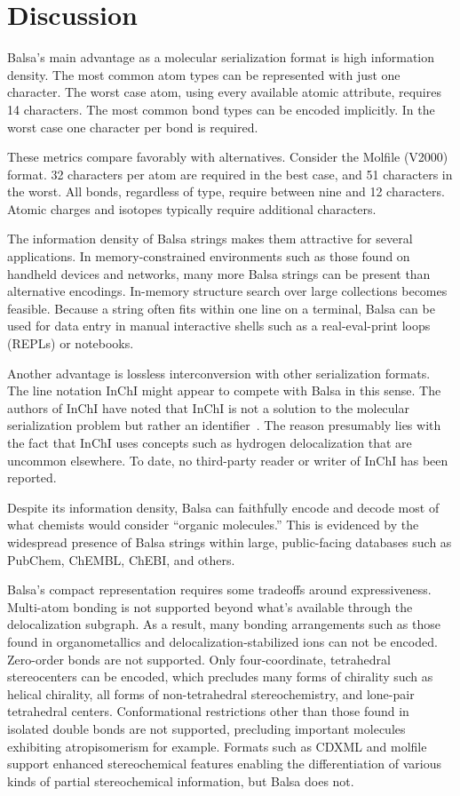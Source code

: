 \documentclass{article}
\begin{document}
\section*{Discussion}

Balsa's main advantage as a molecular serialization format is high information density. The most common atom types can be represented with just one character. The worst case atom, using every available atomic attribute, requires 14 characters. The most common bond types can be encoded implicitly. In the worst case one character per bond is required.

These metrics compare favorably with alternatives. Consider the Molfile (V2000) format. 32 characters per atom are required in the best case, and 51 characters in the worst. All bonds, regardless of type, require between nine and 12 characters. Atomic charges and isotopes typically require additional characters.

The information density of Balsa strings makes them attractive for several applications. In memory-constrained environments such as those found on handheld devices and networks, many more Balsa strings can be present than alternative encodings. In-memory structure search over large collections becomes feasible. Because a string often fits within one line on a terminal, Balsa can be used for data entry in manual interactive shells such as a real-eval-print loops (REPLs) or notebooks.

Another advantage is lossless interconversion with other serialization formats. The line notation InChI might appear to compete with Balsa in this sense. The authors of InChI have noted that InChI is not a solution to the molecular serialization problem but rather an identifier~\cite{heller:2015}. The reason presumably lies with the fact that InChI uses concepts such as hydrogen delocalization that are uncommon elsewhere. To date, no third-party reader or writer of InChI has been reported.

Despite its information density, Balsa can faithfully encode and decode most of what chemists would consider \enquote{organic molecules.} This is evidenced by the widespread presence of Balsa strings within large, public-facing databases such as PubChem,\cite{kim:2016} ChEMBL,\cite{gaulton:2012} ChEBI,\cite{degtyarenko:2007} and others.

Balsa's compact representation requires some tradeoffs around expressiveness. Multi-atom bonding is not supported beyond what's available through the delocalization subgraph. As a result, many bonding arrangements such as those found in organometallics and delocalization-\-stabilized ions can not be encoded. Zero-\-order bonds are not supported. Only four-\-coordinate, tetrahedral stereocenters can be encoded, which precludes many forms of chirality such as helical chirality, all forms of non-\-tetrahedral stereochemistry, and lone-\-pair tetrahedral centers. Conformational restrictions other than those found in isolated double bonds are not supported, precluding important molecules exhibiting atropisomerism for example. Formats such as CDXML and molfile support enhanced stereochemical features enabling the differentiation of various kinds of partial stereochemical information, but Balsa does not.
\end{document}
